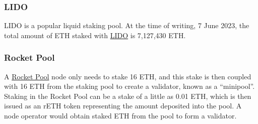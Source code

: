 \documentclass[UTF8]{article}
\begin{document}
\subsubsection*{LIDO}
LIDO is a popular liquid staking pool. 
At the time of writing, 7 June 2023, the total amount of ETH staked with \href{https://lido.fi/ethereum}{LIDO}  is 7,127,430 ETH. 

%
% 
%
%


\subsubsection*{Rocket Pool}
A \href{https://rocketpool.net/}{Rocket Pool} node only needs to stake 16 ETH, and this stake is then coupled with 16 ETH from the staking pool to create a validator, known as a ``minipool''.  Staking in the Rocket Pool can be a stake of a little as 0.01 ETH, which is then issued as an rETH token representing the amount deposited into the pool. A node operator would obtain staked ETH from the pool to form a validator.
\end{document}
